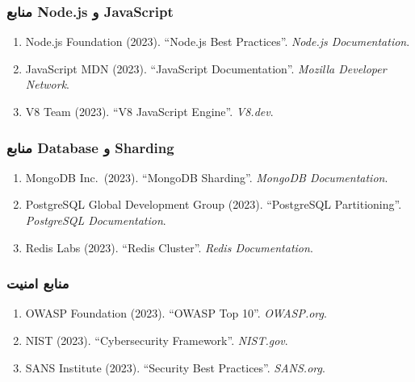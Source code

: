 \documentclass[
]{article}
\begin{document}
\subsubsection{منابع Node.js و
JavaScript}\label{ux645ux646ux627ux628ux639-node.js-ux648-javascript}

\begin{enumerate}
\def\labelenumi{\arabic{enumi}.}
\setcounter{enumi}{36}
\item
  Node.js Foundation (2023). ``Node.js Best Practices''. \emph{Node.js
  Documentation}.
\item
  JavaScript MDN (2023). ``JavaScript Documentation''. \emph{Mozilla
  Developer Network}.
\item
  V8 Team (2023). ``V8 JavaScript Engine''. \emph{V8.dev}.
\end{enumerate}

\subsubsection{منابع Database و
Sharding}\label{ux645ux646ux627ux628ux639-database-ux648-sharding}

\begin{enumerate}
\def\labelenumi{\arabic{enumi}.}
\setcounter{enumi}{39}
\item
  MongoDB Inc.~(2023). ``MongoDB Sharding''. \emph{MongoDB
  Documentation}.
\item
  PostgreSQL Global Development Group (2023). ``PostgreSQL
  Partitioning''. \emph{PostgreSQL Documentation}.
\item
  Redis Labs (2023). ``Redis Cluster''. \emph{Redis Documentation}.
\end{enumerate}

\subsubsection{منابع
امنیت}\label{ux645ux646ux627ux628ux639-ux627ux645ux646ux6ccux62a}

\begin{enumerate}
\def\labelenumi{\arabic{enumi}.}
\setcounter{enumi}{42}
\item
  OWASP Foundation (2023). ``OWASP Top 10''. \emph{OWASP.org}.
\item
  NIST (2023). ``Cybersecurity Framework''. \emph{NIST.gov}.
\item
  SANS Institute (2023). ``Security Best Practices''. \emph{SANS.org}.
\end{enumerate}
\end{document}
